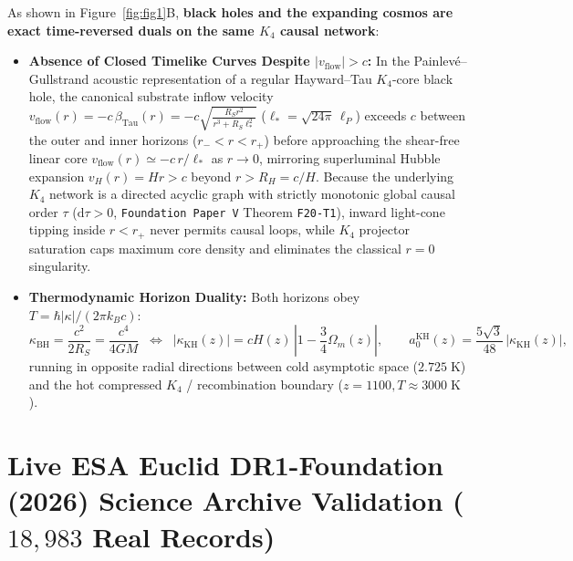 \documentclass[11pt,a4paper]{article}
\begin{document}
As shown in Figure~\ref{fig:fig1}B, \textbf{black holes and the expanding cosmos are exact time-reversed duals on the same $K_4$ causal network}:
\begin{itemize}
  \item \textbf{Absence of Closed Timelike Curves Despite $|v_{\mathrm{flow}}| > c$:} In the Painlev\'e--Gullstrand acoustic representation of a regular Hayward--Tau $K_4$-core black hole, the canonical substrate inflow velocity $v_{\mathrm{flow}}(r) = -c\,\beta_{\mathrm{Tau}}(r) = -c\sqrt{\frac{R_S r^2}{r^3 + R_S\ell_*^2}}$ ($\ell_* = \sqrt{24\pi}\,\ell_P$) exceeds $c$ between the outer and inner horizons ($r_- < r < r_+$) before approaching the shear-free linear core $v_{\mathrm{flow}}(r) \simeq -c\,r/\ell_*$ as $r \to 0$, mirroring superluminal Hubble expansion $v_H(r) = H r > c$ beyond $r > R_H = c/H$. Because the underlying $K_4$ network is a directed acyclic graph with strictly monotonic global causal order $\tau$ ($\mathrm{d}\tau > 0$, \texttt{Foundation Paper V} Theorem \texttt{F20-T1}), inward light-cone tipping inside $r < r_+$ never permits causal loops, while $K_4$ projector saturation caps maximum core density and eliminates the classical $r = 0$ singularity.
  \item \textbf{Thermodynamic Horizon Duality:} Both horizons obey $T = \hbar |\kappa|/(2\pi k_B c)$:
  \begin{equation}
    \kappa_{\mathrm{BH}} = \frac{c^2}{2 R_S} = \frac{c^4}{4 G M} \;\;\Longleftrightarrow\;\;
    |\kappa_{\mathrm{KH}}(z)| = c H(z)\,\left|1 - \frac{3}{4}\Omega_m(z)\right|, \qquad
    a_0^{\mathrm{KH}}(z) = \frac{5\sqrt{3}}{48}\,|\kappa_{\mathrm{KH}}(z)|,
  \end{equation}
  running in opposite radial directions between cold asymptotic space ($2.725\;\mathrm{K}$) and the hot compressed $K_4$ / recombination boundary ($z = 1100, T \approx 3000\;\mathrm{K}$).
\end{itemize}

\newpage
\section{Live ESA Euclid DR1-Foundation (2026) Science Archive Validation (\texorpdfstring{$18,983$}{18,983} Real Records)}
\end{document}
